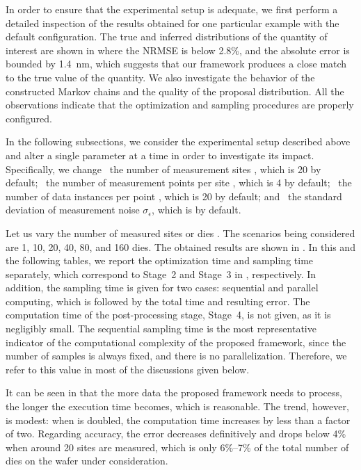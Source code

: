 In order to ensure that the experimental setup is adequate, we first perform a
detailed inspection of the results obtained for one particular example with the
default configuration. The true and inferred distributions of the quantity of
interest are shown in  where the \ac{NRMSE}
is below 2.8\%, and the absolute error is bounded by 1.4~nm, which suggests that
our framework produces a close match to the true value of the quantity. We also
investigate the behavior of the constructed Markov chains and the quality of the
proposal distribution. All the observations indicate that the optimization and
sampling procedures are properly configured.

In the following subsections, we consider the experimental setup described above
and alter a single parameter at a time in order to investigate its impact.
Specifically, we change \one~the number of measurement sites \hnd, which is 20
by default; \two~the number of measurement points per site \np, which is 4 by
default; \three~the number of data instances per point \ns, which is 20 by
default; and \four~the standard deviation of measurement noise
$\sigma_\epsilon$, which is  by default.


Let us vary the number of measured sites or dies \hnd. The scenarios being
considered are 1, 10, 20, 40, 80, and 160 dies. The obtained results are shown
in . In this and the following tables, we report the
optimization time and sampling time separately, which correspond to Stage~2 and
Stage~3 in , respectively. In addition, the sampling time
is given for two cases: sequential and parallel computing, which is followed by
the total time and resulting error. The computation time of the post-processing
stage, Stage~4, is not given, as it is negligibly small. The sequential sampling
time is the most representative indicator of the computational complexity of the
proposed framework, since the number of samples is always fixed, and there is no
parallelization. Therefore, we refer to this value in most of the discussions
given below.

It can be seen in  that the more data the proposed framework
needs to process, the longer the execution time becomes, which is reasonable.
The trend, however, is modest: when \hnd is doubled, the computation time
increases by less than a factor of two. Regarding accuracy, the error decreases
definitively and drops below 4\% when around 20 sites are measured, which is
only 6\%--7\% of the total number of dies on the wafer under consideration.

